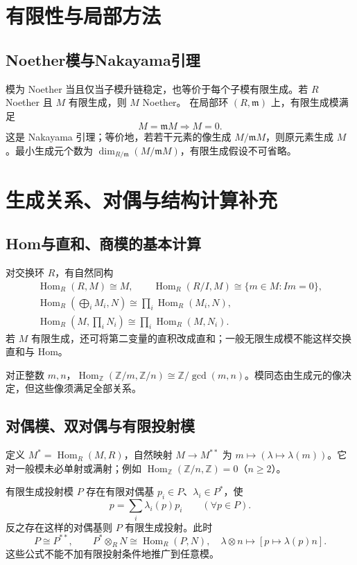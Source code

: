 \documentclass[../main.tex]{subfiles}
\begin{document}
\section{有限性与局部方法}
\subsection{Noether模与Nakayama引理}
模为 Noether 当且仅当子模升链稳定，也等价于每个子模有限生成。若 $R$ Noether 且 $M$ 有限生成，则 $M$ Noether。
在局部环 $(R,\mathfrak m)$ 上，有限生成模满足
\[
M=\mathfrak mM\Longrightarrow M=0.
\]
这是 Nakayama 引理；等价地，若若干元素的像生成 $M/\mathfrak mM$，则原元素生成 $M$。最小生成元个数为 $\dim_{R/\mathfrak m}(M/\mathfrak mM)$，有限生成假设不可省略。
\section{生成关系、对偶与结构计算补充}
\subsection{Hom与直和、商模的基本计算}
对交换环 $R$，有自然同构
\begin{gather*}
\operatorname{Hom}_R(R,M)\cong M,\qquad
\operatorname{Hom}_R(R/I,M)\cong\{m\in M:Im=0\},\\
\operatorname{Hom}_R\!\left(\bigoplus_iM_i,N\right)\cong\prod_i\operatorname{Hom}_R(M_i,N),\\
\operatorname{Hom}_R\!\left(M,\prod_iN_i\right)\cong\prod_i\operatorname{Hom}_R(M,N_i).
\end{gather*}
若 $M$ 有限生成，还可将第二变量的直积改成直和；一般无限生成模不能这样交换直和与 Hom。

对正整数 $m,n$，$\operatorname{Hom}_{\mathbb Z}(\mathbb Z/m,\mathbb Z/n)\cong\mathbb Z/\gcd(m,n)$。模同态由生成元的像决定，但这些像须满足全部关系。

\subsection{对偶模、双对偶与有限投射模}
定义 $M^*=\operatorname{Hom}_R(M,R)$，自然映射 $M\to M^{**}$ 为 $m\mapsto(\lambda\mapsto\lambda(m))$。它对一般模未必单射或满射；例如 $\operatorname{Hom}_{\mathbb Z}(\mathbb Z/n,\mathbb Z)=0$（$n\ge2$）。

有限生成投射模 $P$ 存在有限对偶基 $p_i\in P$、$\lambda_i\in P^*$，使
\[
p=\sum_i\lambda_i(p)p_i\qquad(\forall p\in P).
\]
反之存在这样的对偶基则 $P$ 有限生成投射。此时
\[
P\cong P^{**},\qquad P^*\otimes_RN\cong\operatorname{Hom}_R(P,N),\quad
\lambda\otimes n\longmapsto[p\mapsto\lambda(p)n].
\]
这些公式不能不加有限投射条件地推广到任意模。
\end{document}
